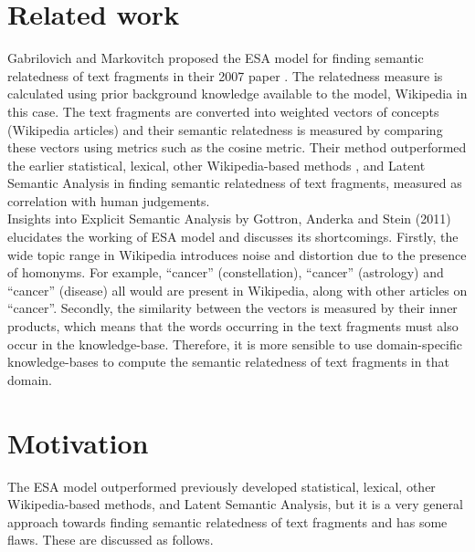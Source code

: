 \documentclass[conference]{IEEEtran}
\begin{document}
\section{Related work}

Gabrilovich and Markovitch proposed the ESA model for finding semantic relatedness of text fragments in their 2007 paper \cite{ESA}. The relatedness measure is calculated using prior background knowledge available to the model, Wikipedia in this case. The text fragments are converted into weighted vectors of concepts (Wikipedia articles) and their semantic relatedness is measured by comparing these vectors using metrics such as the cosine metric. Their method outperformed the earlier statistical, lexical, other Wikipedia-based methods \cite{WikiRelate}, and Latent Semantic Analysis in finding semantic relatedness of text fragments, measured as correlation with human judgements.\\
Insights into Explicit Semantic Analysis by Gottron, Anderka and Stein (2011) \cite{insights} elucidates the working of ESA model and discusses its shortcomings. Firstly, the wide topic range in Wikipedia introduces noise and distortion due to the presence of homonyms. For example, ``cancer'' (constellation), ``cancer'' (astrology) and ``cancer'' (disease) all would are present in Wikipedia, along with other articles on “cancer”. Secondly, the similarity between the vectors is measured by their inner products, which means that the words occurring in the text fragments must also occur in the knowledge-base. Therefore, it is more sensible to use domain-specific knowledge-bases to compute the semantic relatedness of text fragments in that domain.


\section{Motivation}

The ESA model outperformed previously developed statistical, lexical, other Wikipedia-based methods, and Latent Semantic Analysis, but it is a very general approach towards finding semantic relatedness of text fragments and has some flaws. These are discussed as follows.
\end{document}
